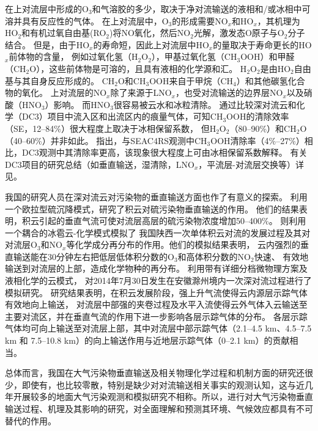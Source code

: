 在上对流层中形成的O$_3$和气溶胶的多少，取决于净对流输送的液相和/或冰相中可溶并具有反应性的气体。
在上对流层中，O$_3$的形成需要NO$_x$和HO$_x$，其机理为HO$_2$和有机过氧自由基(RO$_2$)将NO氧化，然后NO$_2$光解，激发态O原子与O$_2$分子结合。
但是，由于HO$_x$的寿命短，因此上对流层中HO$_x$的量取决于寿命更长的HO$_x$前体物的含量，
例如过氧化氢（H$_2$O$_2$），甲基过氧化氢（CH$_3$OOH）和甲醛（CH$_2$O）\citep{Chatfield.1984,Prather.1997}，这些前体物是可溶的，且具有液相的化学源和汇\citep{Barth.2007,Carlton.2007}。
H$_2$O$_2$是由HO$_2$自由基与其自身反应形成的。 CH$_2$O和CH$_3$OOH来自于甲烷（CH$_4$）和其他碳氢化合物的氧化。
上对流层的NO$_x$除了来源于LNO$_x$，也受对流输送的边界层NO$_x$以及硝酸（HNO$_3$）影响\citep{Grassian.2005}。
而HNO$_3$很容易被云水和冰粒清除\citep{Neu.2012}。
通过比较深对流云和化学（DC3）项目中流入区和出流区内的痕量气体，可知CH$_3$OOH的清除效率（SE，12--84\%）很大程度上取决于冰相保留系数，
但H$_2$O$_2$（80--90\%）和CH$_2$O（40--60\%）并非如此\citep{Barth.2016,Bela.2016,Fried.2016}。
\citet{Cuchiara.2020}指出，与SEAC4RS观测中CH$_3$OOH清除率（4\%--27\%）相比，DC3观测中其清除率更高，该现象很大程度上可由冰相保留系数解释。
有关DC3项目的研究总结（如垂直输送，湿清除，LNO$_x$，平流层-对流层交换等）详见\citet{Barth.2019}。

我国的研究人员在深对流云对污染物的垂直输送方面也作了有意义的探索。
\citet{GaoHuiWang.1998}利用一个欧拉型硫沉降模式，研究了积云对硫污染物垂直输送的作用。
他们的结果表明，积云引起的垂直气流可使对流层高层的硫污染物浓度增加50--400\%。
\cite{LiBing.1999,LiBing.2001}则利用一个耦合的冰雹云-化学模式模拟了
我国陕西一次单体积云对流的发展过程及其对对流层O$_3$和NO$_x$等化学成分再分布的作用。他们的模拟结果表明，
云内强烈的垂直输送能在30分钟左右把低层低体积分数的O$_3$和高体积分数的NO$_2$快速、
有效地输送到对流层的上部，造成化学物种的再分布。
\citet{HuJiaYing.2019}利用带有详细分档微物理方案及液相化学的云模式，
对2014年7月30日发生在安徽滁州境内一次深对流过程进行了模拟研究。
研究结果表明，在积云发展阶段，强上升气流使得云内源层示踪气体有效地向上输送，
对流层中部强的夹卷过程及水平入流使得云外气体入云输送至主要对流区，并在垂直气流的作用下进一步影响各层示踪气体的分布。
各层示踪气体均可向上输送至对流层上部，其中对流层中部示踪气体（2.1--4.5 km、4.5--7.5 km 和 7.5--10.8 km）的向上输送作用与近地层示踪气体（0--2.1 km）的贡献相当。

总体而言，我国在大气污染物垂直输送及相关物理化学过程和机制方面的研究还很少，即使有，也比较零散，特别是缺少对对流输送相关事实的观测认知，这与近几年开展较多的地面大气污染观测和模拟研究不相称。所以，进行对大气污染物垂直输送过程、机理及其影响的研究，对全面理解和预测其环境、气候效应都具有不可替代的作用。


